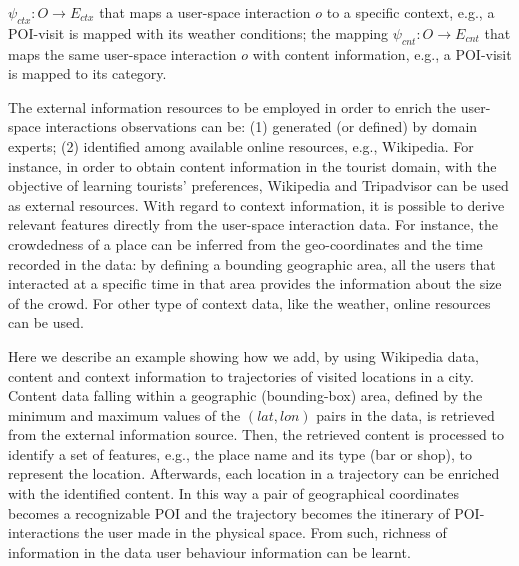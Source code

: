 $\psi_{ctx}: O \rightarrow E_{ctx}$ that maps a user-space interaction $o$ to a specific context, e.g., a POI-visit is mapped with its weather conditions; the mapping $\psi_{cnt}: O \rightarrow E_{cnt}$ that maps the same user-space interaction $o$ with content information, e.g., a POI-visit is mapped to its category.

The external information resources to be employed in order to enrich the user-space interactions observations can be: (1) generated (or defined) by domain experts; (2) identified among available online resources, e.g., Wikipedia.
For instance, in order to obtain content information in the tourist domain, with the objective of learning tourists' preferences, Wikipedia and Tripadvisor can be used as external resources.
With regard to context information, it is possible to derive relevant features directly from the user-space interaction data. For instance, the crowdedness of a place can be inferred from the geo-coordinates and the time recorded in the data: by defining a bounding geographic area, all the users that interacted at a specific time in that area provides the information about the size of the crowd. For other type of context data, like the weather, online resources can be used.

Here we describe an example showing how we add, by using Wikipedia data, content and context information to trajectories of visited locations in a city.
Content data falling within a geographic (bounding-box) area, defined by the minimum and maximum values of the $(lat,lon)$ pairs in the data, is retrieved from the external information source. %
Then, the retrieved content is processed to identify a set of features, e.g., the place name and its type (bar or shop), to represent the location. 
Afterwards, each location in a trajectory can be enriched with the identified content. In this way a pair of geographical coordinates becomes a recognizable POI and the trajectory becomes the itinerary of POI-interactions the user made in the physical space. From such, richness of information in the data user behaviour information can be learnt.


